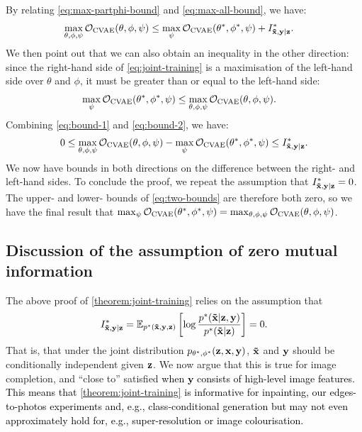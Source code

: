 By relating \cref{eq:max-partphi-bound} and \cref{eq:max-all-bound}, we have:
\begin{align}
  \max_{\theta, \phi, \psi } {\mathcal{O}}_\text{CVAE}(\theta, \phi, \psi ) &\leq  \max_{\psi } {\mathcal{O}}_\text{CVAE}({\theta}^*, {\phi}^*, \psi ) + I^*_{\mathbf{\tilde{x}}{},\mathbf{y}{}|\mathbf{z}{}}{}. \label{eq:bound-1}
\end{align}
We then point out that we can also obtain an inequality in the other direction: since
the right-hand side of \cref{eq:joint-training} is a maximisation of the left-hand side over $\theta$ and
$\phi$, it must be greater than or equal to the left-hand side:
\begin{align}
  \max_{\psi } {\mathcal{O}}_\text{CVAE}({\theta}^*, {\phi}^*, \psi ) &\leq  \max_{\theta, \phi, \psi } {\mathcal{O}}_\text{CVAE}(\theta, \phi, \psi )  . \label{eq:bound-2}
\end{align}
Combining \cref{eq:bound-1} and \cref{eq:bound-2}, we have:
\begin{align}
  0 \leq \max_{\theta, \phi, \psi } {\mathcal{O}}_\text{CVAE}(\theta, \phi, \psi ) - \max_{\psi } {\mathcal{O}}_\text{CVAE}({\theta}^*, {\phi}^*, \psi ) \leq I^*_{\mathbf{\tilde{x}}{},\mathbf{y}{}|\mathbf{z}{}}{}. \label{eq:two-bounds}
\end{align}
We now have bounds in both directions on the difference between the right- and
left-hand sides. To conclude the proof, we repeat the assumption that
$I^*_{\mathbf{\tilde{x}}{},\mathbf{y}{}|\mathbf{z}{}}{}=0$. The upper- and lower- bounds of \cref{eq:two-bounds} are
therefore both zero, so we have the final result that ${\max_{\psi }
{\mathcal{O}}_\text{CVAE}({\theta}^*, {\phi}^*, \psi ) =
\max_{\theta, \phi, \psi } {\mathcal{O}}_\text{CVAE}(\theta, \phi,
\psi )}$.

\subsection{Discussion of the assumption of zero mutual information}
The above proof of \cref{theorem:joint-training} relies on the assumption that
\begin{equation}
    I^*_{\mathbf{\tilde{x}}{},\mathbf{y}{}|\mathbf{z}{}}{} = \mathbb{E}_{{p}^*{}(\mathbf{\tilde{x}}{}, {\mathbf{y}}, {\mathbf{z}})} \left[ \log \frac{{p}^*{}(\mathbf{\tilde{x}}{}|{\mathbf{z}}, {\mathbf{y}}) }{ {p}^*{}(\mathbf{\tilde{x}}{}|{\mathbf{z}}) } \right] = 0.    
\end{equation}
That is, that under the joint distribution $p_{\theta^*,\phi^*}({\mathbf{z}},{\mathbf{x}},{\mathbf{y}})$, $\mathbf{\tilde{x}}{}$ and
${\mathbf{y}}$ should be conditionally independent given ${\mathbf{z}}$. We now argue that this
is true for image completion, and ``close to'' satisfied \textcolor{black}{when
  $\mathbf{y}$ consists of high-level image features. This means that
  \cref{theorem:joint-training} is informative for inpainting, our
  edges-to-photos experiments and, e.g., class-conditional generation but may
  not even approximately hold for, e.g., super-resolution or image
  colourisation.}

